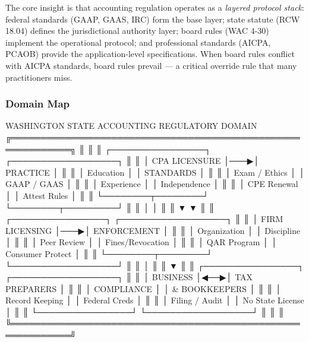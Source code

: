 \documentclass[11pt,letterpaper]{article}
\begin{document}
The core insight is that accounting regulation operates as a \emph{layered protocol stack}: federal standards (GAAP, GAAS, IRC) form the base layer; state statute (RCW 18.04) defines the jurisdictional authority layer; board rules (WAC 4-30) implement the operational protocol; and professional standards (AICPA, PCAOB) provide the application-level specifications. When board rules conflict with AICPA standards, board rules prevail --- a critical override rule that many practitioners miss.

\subsubsection{Domain Map}

\begin{asciibox}
           WASHINGTON STATE ACCOUNTING REGULATORY DOMAIN
  ╔════════════════════════════════════════════════════════════╗
  ║                                                            ║
  ║  ┌────────────────┐    ┌──────────────────┐               ║
  ║  │  CPA LICENSURE  │───▶│  PRACTICE         │              ║
  ║  │  Education       │    │  STANDARDS        │              ║
  ║  │  Exam / Ethics   │    │  GAAP / GAAS      │              ║
  ║  │  Experience      │    │  Independence     │              ║
  ║  │  CPE Renewal     │    │  Attest Rules     │              ║
  ║  └────────┬────────┘    └────────┬─────────┘              ║
  ║           │                      │                         ║
  ║           ▼                      ▼                         ║
  ║  ┌────────────────┐    ┌──────────────────┐               ║
  ║  │  FIRM LICENSING  │───▶│  ENFORCEMENT      │              ║
  ║  │  Organization    │    │  Discipline       │              ║
  ║  │  Peer Review     │    │  Fines/Revocation │              ║
  ║  │  QAR Program     │    │  Consumer Protect │              ║
  ║  └────────┬────────┘    └──────────────────┘              ║
  ║           │                                                ║
  ║           ▼                                                ║
  ║  ┌────────────────┐    ┌──────────────────┐               ║
  ║  │  BUSINESS        │◀──▶│  TAX PREPARERS    │              ║
  ║  │  COMPLIANCE      │    │  & BOOKKEEPERS    │              ║
  ║  │  Record Keeping  │    │  Federal Creds    │              ║
  ║  │  Filing / Audit  │    │  No State License │              ║
  ║  └────────────────┘    └──────────────────┘              ║
  ║                                                            ║
  ╚════════════════════════════════════════════════════════════╝
\end{asciibox}
\end{document}

